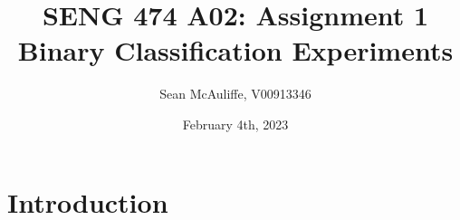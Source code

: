\documentclass[12pt, a4paper]{report}
\title{SENG 474 A02: Assignment 1 \\[1ex]
\large Binary Classification Experiments}
\author{Sean McAuliffe, V00913346 }
\date{February 4th, 2023}
\begin{document}
\maketitle

\section{Introduction}
\end{document}
